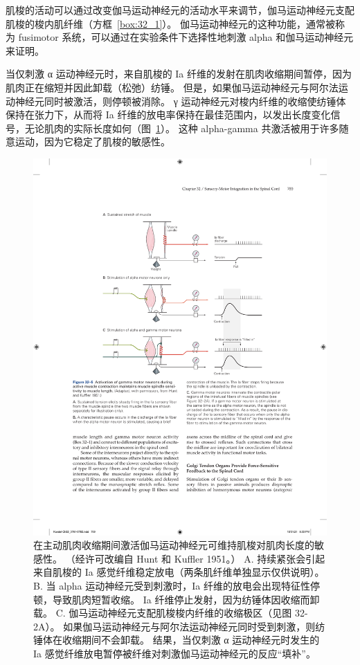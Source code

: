 肌梭的活动可以通过改变伽马运动神经元的活动水平来调节，伽马运动神经元支配肌梭的梭内肌纤维（方框~\ref{box:32_1}）。
伽马运动神经元的这种功能，通常被称为 fusimotor 系统，可以通过在实验条件下选择性地刺激 alpha 和伽马运动神经元来证明。


当仅刺激 α 运动神经元时，来自肌梭的 Ia 纤维的发射在肌肉收缩期间暂停，因为肌肉正在缩短并因此卸载（松弛）纺锤。
但是，如果伽马运动神经元与阿尔法运动神经元同时被激活，则停顿被消除。
γ 运动神经元对梭内纤维的收缩使纺锤体保持在张力下，从而将 Ia 纤维的放电率保持在最佳范围内，以发出长度变化信号，无论肌肉的实际长度如何（图~\ref{fig:32_5}）。 
这种 alpha-gamma 共激活被用于许多随意运动，因为它稳定了肌梭的敏感性。


\begin{figure}[htbp]
	\centering
	\includegraphics[width=0.75\linewidth]{chap32/fig_32_5}
	\caption{在主动肌肉收缩期间激活伽马运动神经元可维持肌梭对肌肉长度的敏感性。 
	（经许可改编自 Hunt 和 Kuffler 1951。） 
	A. 持续紧张会引起来自肌梭的 Ia 感觉纤维稳定放电（两条肌纤维单独显示仅供说明）。 
	B. 当 alpha 运动神经元受到刺激时，Ia 纤维的放电会出现特征性停顿，导致肌肉短暂收缩。 Ia 纤维停止发射，因为纺锤体因收缩而卸载。
	C. 伽马运动神经元支配肌梭梭内纤维的收缩极区（见图 32-2A）。
	如果伽马运动神经元与阿尔法运动神经元同时受到刺激，则纺锤体在收缩期间不会卸载。
	结果，当仅刺激 α 运动神经元时发生的 Ia 感觉纤维放电暂停被纤维对刺激伽马运动神经元的反应“填补”。}
	\label{fig:32_5}
\end{figure}


